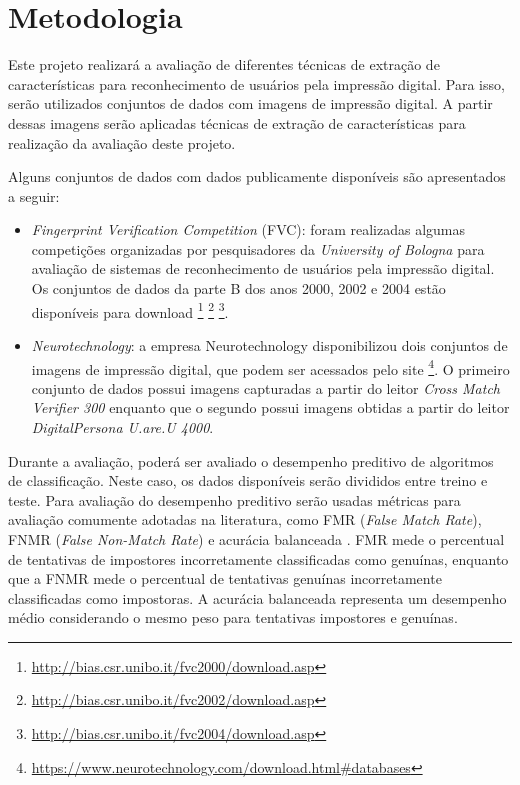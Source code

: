 \section{Metodologia}\label{sec:metodologia}

Este projeto realizará a avaliação de diferentes técnicas de extração de características para reconhecimento de usuários pela impressão digital. Para isso, serão utilizados conjuntos de dados com imagens de impressão digital. A partir dessas imagens serão aplicadas técnicas de extração de características para realização da avaliação deste projeto.

Alguns conjuntos de dados com dados publicamente disponíveis são apresentados a seguir:

\begin{itemize}
    \item \textit{Fingerprint Verification Competition} (FVC): foram realizadas algumas competições organizadas por pesquisadores da \textit{University of Bologna} para avaliação de sistemas de reconhecimento de usuários pela impressão digital. Os conjuntos de dados da parte B dos anos 2000, 2002 e 2004 estão disponíveis para download \footnote{\url{http://bias.csr.unibo.it/fvc2000/download.asp}} 	\footnote{\url{http://bias.csr.unibo.it/fvc2002/download.asp}} 	\footnote{\url{http://bias.csr.unibo.it/fvc2004/download.asp}}.
    
    \item \textit{Neurotechnology}: a empresa Neurotechnology disponibilizou dois conjuntos de imagens de impressão digital, que podem ser acessados pelo site \footnote{\url{https://www.neurotechnology.com/download.html\#databases}}. O primeiro conjunto de dados possui imagens capturadas a partir do leitor \textit{Cross Match Verifier 300} enquanto que o segundo possui imagens obtidas a partir do leitor \textit{DigitalPersona U.are.U 4000}.
\end{itemize}
    
Durante a avaliação, poderá ser avaliado o desempenho preditivo de algoritmos de classificação. Neste caso, os dados disponíveis serão divididos entre treino e teste. Para avaliação do desempenho preditivo serão usadas métricas para avaliação comumente adotadas na literatura, como FMR (\textit{False Match Rate}), FNMR (\textit{False Non-Match Rate}) e acurácia balanceada \cite{Precise2014, Ferlini2021eargate}. FMR mede o percentual de tentativas de impostores incorretamente classificadas como genuínas, enquanto que a FNMR mede o percentual de tentativas genuínas incorretamente classificadas como impostoras. A acurácia balanceada representa um desempenho médio considerando o mesmo peso para tentativas impostores e genuínas.